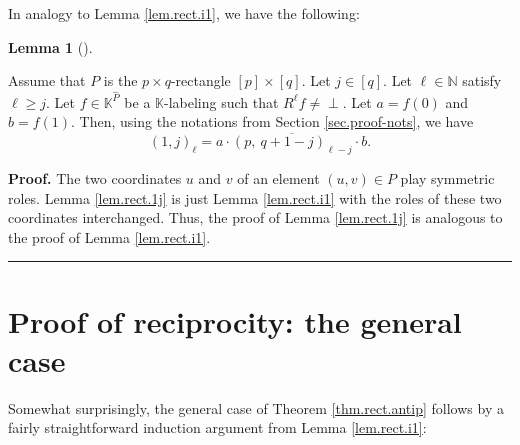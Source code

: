 \documentclass[numbers=enddot,12pt,final,onecolumn,notitlepage]{scrartcl}%
\theoremstyle{definition}
\newtheorem{lem}[theo]{Lemma}
\newenvironment{lemma}[1][]
{\begin{lem}[#1]\begin{leftbar}}
{\end{leftbar}\end{lem}}
\newcommand{\undf}{\operatorname*{\bot}}
\newenvironment{proof}[1][Proof]{\noindent\textbf{#1.} }{\ \rule{0.5em}{0.5em}}
\begin{document}
In analogy to Lemma \ref{lem.rect.i1}, we have the following:

\begin{lemma}
\label{lem.rect.1j}Assume that $P$ is the $p\times q$-rectangle $\left[
p\right]  \times\left[  q\right]  $. Let $j\in\left[  q\right]  $. Let
$\ell\in\mathbb{N}$ satisfy $\ell\geq j$. Let $f\in\mathbb{K}^{\widehat{P}}$
be a $\mathbb{K}$-labeling such that $R^{\ell}f\neq\undf$. Let $a=f\left(
0\right)  $ and $b=f\left(  1\right)  $. Then, using the notations from
Section \ref{sec.proof-nots}, we have%
\[
\left(  1,j\right)  _{\ell}=a\cdot\overline{\left(  p,\ q+1-j\right)
_{\ell-j}}\cdot b.
\]

\end{lemma}

\begin{proof}
The two coordinates $u$ and $v$ of an element $\left(  u,v\right)  \in P$ play
symmetric roles. Lemma \ref{lem.rect.1j} is just Lemma \ref{lem.rect.i1} with
the roles of these two coordinates interchanged. Thus, the proof of Lemma
\ref{lem.rect.1j} is analogous to the proof of Lemma \ref{lem.rect.i1}.
\end{proof}

\section{\label{sec.gencase}Proof of reciprocity: the general case}

Somewhat surprisingly, the general case of Theorem \ref{thm.rect.antip}
follows by a fairly straightforward induction argument from Lemma
\ref{lem.rect.i1}:
\end{document}
